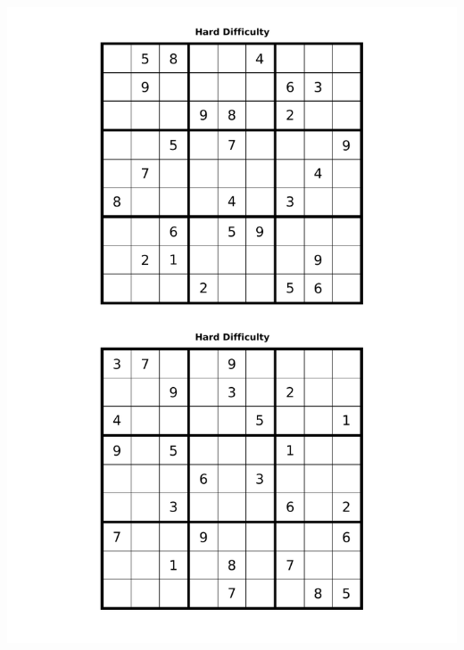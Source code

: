\documentclass[10pt,a4paper,twoside]{report}
\begin{document}
\vspace{\fill}
\includegraphics[height=24cm]{hard.pdf}
\vspace{\fill}
\end{document}
